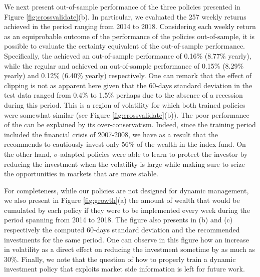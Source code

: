 \documentclass[]{interact}
\theoremstyle{plain}%
\theoremstyle{definition}
\theoremstyle{remark}
\newcommand{\0}{\V{0}}
\newcommand{\1}{\V{1}}
\theoremstyle{plain}
\theoremstyle{definition}
\begin{document}
We next present out-of-sample performance of the three policies presented in Figure \ref{fig:crossvalidate}(b). In particular, we evaluated the 257 weekly returns achieved in the period ranging from 2014 to 2018. Considering each weekly return as an equiprobable outcome of the performance of the policies out-of-sample, it is possible to evaluate the certainty equivalent of the out-of-sample performance. Specifically, the \adaptPclipped{} achieved an out-of-sample performance of 0.16\% (8.77\% yearly), while the regular  \adaptPstd{} and \fixedP{} achieved an out-of-sample performance of   0.15\% (8.29\% yearly) and  0.12\% (6.40\% yearly) respectively. One can remark that the effect of clipping is not as apparent here given that the 60-days standard deviation in the test data ranged from 0.4\% to 1.5\% perhaps due to the absence of a recession during this period. This is a region of volatility for which both trained policies were somewhat similar (see Figure \ref{fig:crossvalidate}(b)). The poor performance of the \fixedP{} can be explained by its over-conservatism. Indeed, since the training period included the financial crisis of 2007-2008, we have as a result that the \fixedP{} recommends to cautiously invest only 56\% of the wealth in the index fund. On the other hand, $\sigma$-adapted policies were able to learn to protect the investor by reducing the investment when the volatility is large while making sure to seize the opportunities in markets that are more stable. 

For completeness, while our policies are not designed for dynamic management, we also present in Figure \ref{fig:growth}(a) the amount of wealth that would be cumulated by each policy if they were to be implemented every week during the period spanning from 2014 to 2018. The figure also presents in (b) and (c) respectively the computed 60-days standard deviation and the recommended investments for the same period. One can observe in this figure how an increase in volatility as a direct effect on reducing the investment sometime by as much as 30\%. Finally, we note that the question of how to properly train a dynamic investment policy that exploits market side information is left for future work.
\end{document}
